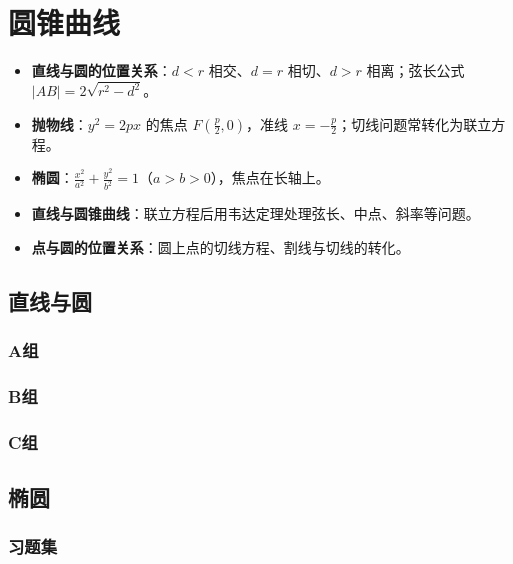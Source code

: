\chapter{圆锥曲线}

\begin{knowledgeframe}
\begin{itemize}
	\item \textbf{直线与圆的位置关系}：$d<r$ 相交、$d=r$ 相切、$d>r$ 相离；弦长公式 $|AB|=2\sqrt{r^2-d^2}$。
	\item \textbf{抛物线}：$y^2=2px$ 的焦点 $F(\frac{p}{2},0)$，准线 $x=-\frac{p}{2}$；切线问题常转化为联立方程。
	\item \textbf{椭圆}：$\frac{x^2}{a^2}+\frac{y^2}{b^2}=1$（$a>b>0$），焦点在长轴上。
	\item \textbf{直线与圆锥曲线}：联立方程后用韦达定理处理弦长、中点、斜率等问题。
	\item \textbf{点与圆的位置关系}：圆上点的切线方程、割线与切线的转化。
\end{itemize}
\end{knowledgeframe}

\section{直线与圆}

\startexercise

\subsection*{A组}



\subsection*{B组}



\subsection*{C组}



\stopexercise

\section{椭圆}

\startexercise

\subsection*{习题集}



\stopexercise
